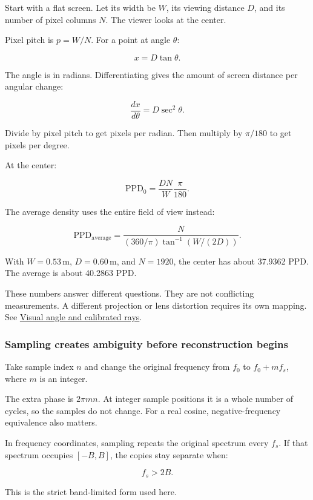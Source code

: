 Start with a flat screen. Let its width be \(W\), its viewing distance \(D\), and its number of pixel columns \(N\). The viewer looks at the center.

Pixel pitch is \(p=W/N\). For a point at angle \(\theta\):

\[
x=D\tan\theta.
\]

The angle is in radians. Differentiating gives the amount of screen distance per angular change:

\[
\frac{dx}{d\theta}=D\sec^2\theta.
\]

Divide by pixel pitch to get pixels per radian. Then multiply by \(\pi/180\) to get pixels per degree.

At the center:

\[
\mathrm{PPD}_0=\frac{DN}{W}\frac{\pi}{180}.
\]

The average density uses the entire field of view instead:

\[
\mathrm{PPD}_{\mathrm{average}}
=\frac{N}{(360/\pi)\tan^{-1}(W/(2D))}.
\]

With \(W=0.53\,\mathrm{m}\), \(D=0.60\,\mathrm{m}\), and \(N=1920\), the center has about 37.9362 PPD. The average is about 40.2863 PPD.

These numbers answer different questions. They are not conflicting measurements. A different projection or lens distortion requires its own mapping. See \hyperref[appendix-7d356c396d1a]{Visual angle and calibrated rays}.

\subsubsection{Sampling creates ambiguity before reconstruction begins}\label{04-visual-computing-ii-ch043-sampling-creates-ambiguity-before-reconstruction-begins}

Take sample index \(n\) and change the original frequency from \(f_0\) to \(f_0+mf_s\), where \(m\) is an integer.

The extra phase is \(2\pi mn\). At integer sample positions it is a whole number of cycles, so the samples do not change. For a real cosine, negative-frequency equivalence also matters.

In frequency coordinates, sampling repeats the original spectrum every \(f_s\). If that spectrum occupies \([-B,B]\), the copies stay separate when:

\[
f_s>2B.
\]

This is the strict band-limited form used here.

